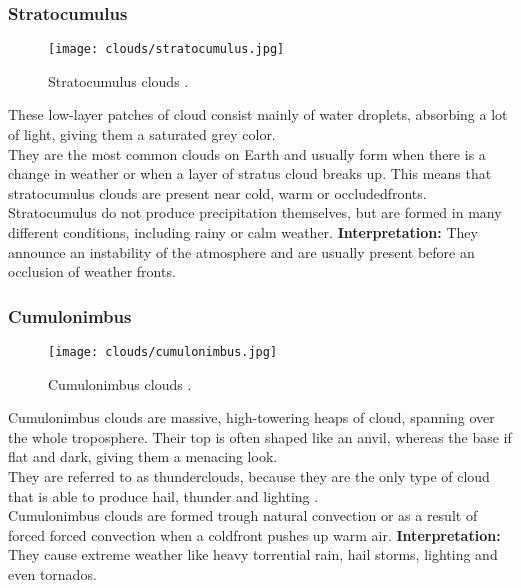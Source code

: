 \subsubsection{Stratocumulus}
\begin{wrapfigure}[10]{r}{6.3cm}
    \vspace{-\baselineskip}
    \texttt{[image: clouds/stratocumulus.jpg]}
    \caption{Stratocumulus clouds \protect\cite{cloudtypes:meteoblue}.}
    \label{img:clouds:stratocumulus}
\end{wrapfigure}
These low-layer patches of cloud consist mainly of water droplets, absorbing a lot of light, giving them a saturated grey color.
\\
They are the most common clouds on Earth and usually form when there is a change in weather or when a layer of stratus cloud breaks up.
This means that stratocumulus clouds are present near cold, warm or \gls{occludedfront}s.
\\
Stratocumulus do not produce \gls{precipitation} themselves, but are formed in many different conditions, including rainy or calm weather.
\emptyline
\textbf{Interpretation:}
They announce an instability of the atmosphere and are usually present before an occlusion of weather fronts.

\pagebreak

\subsubsection{Cumulonimbus}
\begin{wrapfigure}[10]{r}{6.3cm}
    \vspace{-\baselineskip}
    \texttt{[image: clouds/cumulonimbus.jpg]}
    \caption{Cumulonimbus clouds \protect\cite{cloudtypes:wiki:cumulonimbus}.}
    \label{img:clouds:cumulonimbus}
\end{wrapfigure}
Cumulonimbus clouds are massive, high-towering heaps of cloud, spanning over the whole troposphere.
Their top is often shaped like an anvil, whereas the base if flat and dark, giving them a menacing look.
\\
They are referred to as thunderclouds, because they are the only type of cloud that is able to produce hail, thunder and lighting \cite{metoffice:cumulonimbus}.
\\
Cumulonimbus clouds are formed trough natural \gls{convection} or as a result of forced forced \gls{convection} when a \gls{coldfront} pushes up warm air.
\emptyline
\textbf{Interpretation:}
They cause extreme weather like heavy torrential rain, hail storms, lighting and even tornados.